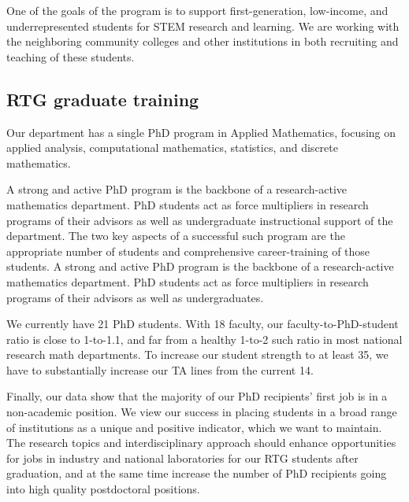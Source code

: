 \documentclass[11pt]{article}
\begin{document}
One of the goals of the program is to support first-generation,
low-income, and underrepresented students for STEM research and learning.
We are working with the neighboring community colleges and other
institutions in both recruiting and teaching of these students.
 


\subsection{RTG graduate training }

 
Our department has a single PhD program in Applied  Mathematics, focusing  
  on applied analysis,     computational mathematics,    statistics, and discrete mathematics. 

A strong and active PhD program is the backbone of a research-active mathematics department. PhD students act as force multipliers in research programs of their advisors as well as undergraduate instructional support of the department. The two key aspects of a successful such program are the appropriate number of students and comprehensive career-training of those students.
A strong and active PhD program is the backbone of a research-active mathematics department. PhD students act as force multipliers in research programs of their advisors as well as undergraduates.

We currently have 21 PhD students. With 18 faculty, our faculty-to-PhD-student ratio is close to 1-to-1.1, and far from a healthy 1-to-2 such ratio in most national research math departments. To increase our student strength to at least 35, we have to substantially increase our TA lines from the current 14.

Finally, our data show that the majority of our PhD recipients’ first job is in a non-academic position.
We view our success in placing students in a broad range of institutions as a unique and positive indicator,
which we want to maintain. The research topics and interdisciplinary approach should enhance opportunities
for jobs in industry and national laboratories for our RTG students after graduation, and at the same time
increase the number of PhD recipients going into high quality postdoctoral positions.
\end{document}
